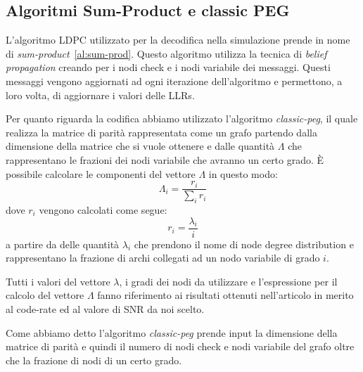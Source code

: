 


\subsection{Algoritmi Sum-Product e classic PEG}\label{subse:algorithms}
L'algoritmo LDPC utilizzato per la decodifica nella simulazione prende in nome di \textit{sum-product}~\ref{al:sum-prod}. Questo algoritmo utilizza la tecnica di \textit{belief propagation} creando per i nodi check e i nodi variabile dei messaggi. Questi messaggi vengono aggiornati ad ogni iterazione dell'algoritmo e permettono, a loro volta, di aggiornare i valori delle LLRs.

Per quanto riguarda la codifica abbiamo utilizzato l'algoritmo \textit{classic-peg}, il quale realizza la matrice di parit\`a rappresentata come un grafo partendo dalla dimensione della matrice che si vuole ottenere e dalle quantit\`a $\Lambda$ che rappresentano le frazioni dei nodi variabile che avranno un certo grado. \`E possibile calcolare le componenti del vettore $\Lambda$ in questo modo:
\begin{equation}
\Lambda_i = \frac{r_i}{\sum_i r_i}
\end{equation}
dove $r_i$ vengono calcolati come segue:
\begin{equation}
r_i = \frac{\lambda_i}{i}
\end{equation}
a partire da delle quantit\`a $\lambda_i$ che prendono il nome di node degree distribution e rappresentano la frazione di archi collegati ad un nodo variabile di grado $i$.

Tutti i valori del vettore $\lambda$, i gradi dei nodi da utilizzare e l'espressione per il calcolo del vettore $\Lambda$ fanno riferimento ai risultati ottenuti nell'articolo \cite{e24101463} in merito al code-rate ed al valore di SNR da noi scelto.

Come abbiamo detto l'algoritmo \textit{classic-peg} prende input la dimensione della matrice di parit\`a e quindi il numero di nodi check e nodi variabile del grafo oltre che la frazione di nodi di un certo grado.

